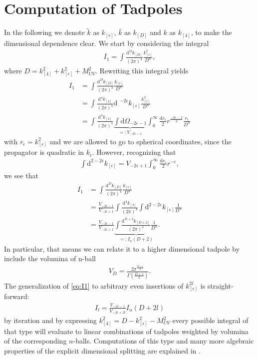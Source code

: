 \section{Computation of Tadpoles}
In the following we denote $\tilde{k}$ as $k_{[\epsilon]}$, $\bar{k}$ as $k_{[D]}$ and $k$ as $k_{[4]}$, to make the dimensional dependence clear. We start by considering the integral 
\begin{align}
	I_1=\int \frac{\text{d}^D k_{[D]}}{(2 \pi)^4} \frac{k_{[\epsilon]}^2}{D^n} ,
\end{align}
where $D=k_{[4]}^2+k_{[\epsilon]}^2+M_{UV}^2$.
Rewriting this integral yields
\begin{align}
	I_1 &=\int \frac{\text{d}^D k_{[D]}}{(2 \pi)^4} \frac{k_{[\epsilon]}}{D^n} \\
		&=\int \frac{\text{d}^4 k_{[4]}}{(2 \pi)^4} \text{d }^{-2\epsilon} k_{[\epsilon]} \frac{k_{[\epsilon]}^2}{D^n} \\
		&=\int \frac{\text{d}^4 k_{[4]}}{(2 \pi)^4} \underbrace{\int \text{d}\Omega_{-2\epsilon-1}}_{=:V_{-2\epsilon-1}} \int_{0}^{\infty}  \frac{\text{d} r_{\epsilon}}{2} r^{\frac{-2\epsilon-2}{2}}\frac{r_{\epsilon}}{D^n}
\end{align}
with $r_{\epsilon}=k_{[\epsilon]}^2$ and we are allowed to go to spherical coordinates, since the propagator is quadratic in $k_{\epsilon}$. However, recognizing that
\begin{align}
\int \text{d}^{2-2 \epsilon} k_{[\epsilon]}	= V_{-2\epsilon+1}\int_{0}^{\infty}\frac{\text{d} r_{\epsilon}}{2} r^{-\epsilon} , 
\end{align}
we see that
\begin{align}
	I_1 &=\int \frac{\text{d}^D k_{[D]}}{(2 \pi)^4} \frac{k_{[\epsilon]}}{D^n} \\
		&= \frac{V_{-2\epsilon-1}}{V_{-2\epsilon+1}}\int \frac{\text{d}^4 k_{[4]}}{(2 \pi)^4} \int \text{d}^{2-2 \epsilon} k_{[\epsilon]} \frac{1}{D^n} \\
		&=\frac{V_{-2\epsilon-1}}{V_{-2\epsilon+1}}\underbrace{\int \frac{\text{d}^{D+2} k_{[D+2]}}{(2 \pi)^4} \frac{1}{D^n}}_{=:I_n(D+2)}. \label{eq:I1}
\end{align}
In particular, that means we can relate it to a higher dimensional tadpole by include the volumina of n-ball
\begin{align}
	V_D=\frac{2\pi^{\frac{D+1}{2}}}{\Gamma\left(\frac{D+1}{2}\right)}.
\end{align}
The generalization of \eqref{eq:I1} to arbitrary even insertions of $k_{[\epsilon]}^{2l}$ is straight-forward:
\begin{align}
	I_l=\frac{V_{-2\epsilon-1}}{V_{-2\epsilon+2l}} I_n(D+2l)
\end{align}
by iteration and by expressing $k_{[4]}^2=D-k_{[\epsilon]}^2-M_{UV}^2$ every possible integral of that type will evaluate to linear combinations of tadpoles weighted by volumina of the corresponding $n$-balls. Computations of this type and many more algebraic properties of the explicit dimensional splitting are explained in \cite{Gnendiger:2017pys}.